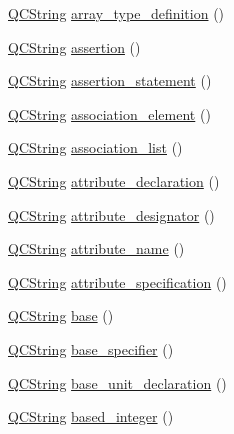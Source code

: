 \begin{DoxyCompactItemize}
\item 
\hyperlink{class_q_c_string}{Q\+C\+String} \hyperlink{classvhdl_1_1parser_1_1_vhdl_parser_a3a24b334f9bffe7bc17120fb6051de80}{array\+\_\+type\+\_\+definition} ()
\item 
\hyperlink{class_q_c_string}{Q\+C\+String} \hyperlink{classvhdl_1_1parser_1_1_vhdl_parser_a8be7a59d43ace6ee69242fa795bb95b9}{assertion} ()
\item 
\hyperlink{class_q_c_string}{Q\+C\+String} \hyperlink{classvhdl_1_1parser_1_1_vhdl_parser_a062c797acd68a8c00bb9386ef1b10d39}{assertion\+\_\+statement} ()
\item 
\hyperlink{class_q_c_string}{Q\+C\+String} \hyperlink{classvhdl_1_1parser_1_1_vhdl_parser_ac10fa5dc6bc7a18eec2bb9fcaf8df943}{association\+\_\+element} ()
\item 
\hyperlink{class_q_c_string}{Q\+C\+String} \hyperlink{classvhdl_1_1parser_1_1_vhdl_parser_a7a47b06be2ea7e4727f17827916e8d84}{association\+\_\+list} ()
\item 
\hyperlink{class_q_c_string}{Q\+C\+String} \hyperlink{classvhdl_1_1parser_1_1_vhdl_parser_aaa4ac7601ffca36d30c4fd3002e3a0b2}{attribute\+\_\+declaration} ()
\item 
\hyperlink{class_q_c_string}{Q\+C\+String} \hyperlink{classvhdl_1_1parser_1_1_vhdl_parser_afc942e45dcd82ad87542caa82f31d7c6}{attribute\+\_\+designator} ()
\item 
\hyperlink{class_q_c_string}{Q\+C\+String} \hyperlink{classvhdl_1_1parser_1_1_vhdl_parser_a82a1d2824bb85b9e12abc08db98c9963}{attribute\+\_\+name} ()
\item 
\hyperlink{class_q_c_string}{Q\+C\+String} \hyperlink{classvhdl_1_1parser_1_1_vhdl_parser_a751ae67162b703a692d5948551be7d3e}{attribute\+\_\+specification} ()
\item 
\hyperlink{class_q_c_string}{Q\+C\+String} \hyperlink{classvhdl_1_1parser_1_1_vhdl_parser_a6e3669b27f0f52aa25c941f57c6dbb9b}{base} ()
\item 
\hyperlink{class_q_c_string}{Q\+C\+String} \hyperlink{classvhdl_1_1parser_1_1_vhdl_parser_a39ab9f8ab5a62a73db27b4eeb4a44729}{base\+\_\+specifier} ()
\item 
\hyperlink{class_q_c_string}{Q\+C\+String} \hyperlink{classvhdl_1_1parser_1_1_vhdl_parser_af4bc27ec24d01878cc053b4431bf5726}{base\+\_\+unit\+\_\+declaration} ()
\item 
\hyperlink{class_q_c_string}{Q\+C\+String} \hyperlink{classvhdl_1_1parser_1_1_vhdl_parser_a441ca5e5addae3e169c44435b67d62ea}{based\+\_\+integer} ()
\item 

\end{DoxyCompactItemize}
